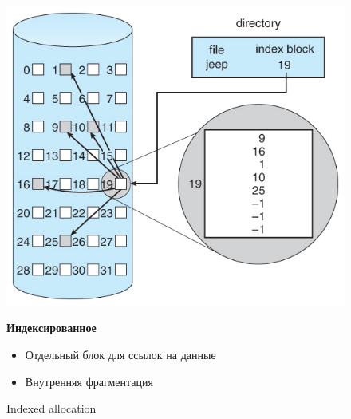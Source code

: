 \documentclass[../../lectures.tex]{subfiles}
\begin{document}
\begin{figure}[H]
\begin{minipage}[c]{0.47\linewidth}
\centering
\includegraphics[width=\textwidth]{images/indexed-allocation.jpg}
\caption{Indexed allocation}
\end{minipage}
\hspace{0.5cm}
\begin{minipage}[c]{0.5\linewidth}
\centering
\textbf{Индексированное}
\begin{itemize}
    \item Отдельный блок для ссылок на данные
    \item Внутренняя фрагментация
\end{itemize}
\end{minipage}
\end{figure}
\end{document}
